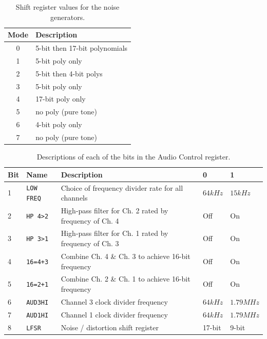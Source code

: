 \documentclass[12pt,a4paper]{article}
\begin{document}
\begin{table}[!htp]
\centering
\caption{Shift register values for the noise generators.}
\label{tab:shift-register}
\small
\begin{tabular}{|c||l|}
\hline
Mode & Description                   \\
\hline\hline
 0    & 5-bit then 17-bit polynomials \\
 1    & 5-bit poly only               \\
 2    & 5-bit then 4-bit polys        \\
 3    & 5-bit poly only               \\
 4    & 17-bit poly only              \\
 5    & no poly (pure tone)           \\
 6    & 4-bit poly only               \\
 7    & no poly (pure tone)           \\
\hline
\end{tabular}
\end{table}

\begin{table}[!htp]
\centering
\caption{Descriptions of each of the bits in the Audio Control register.}
\label{tab:audio-control}
\small
\begin{tabular}{|l|l||l|l|l|}
\hline
 Bit & Name              & Description                                            & 0       & 1         \\
\hline\hline
 1   & \texttt{LOW FREQ} & Choice of frequency divider rate for all channels      & $64kHz$ & $15kHz$   \\
 2   & \texttt{HP 4>2}   & High-pass filter for Ch. 2 rated by frequency of Ch. 4 & Off     & On        \\
 3   & \texttt{HP 3>1}   & High-pass filter for Ch. 1 rated by frequency of Ch. 3 & Off     & On        \\
 4   & \texttt{16=4+3}   & Combine Ch. 4 \& Ch. 3 to achieve 16-bit frequency     & Off     & On        \\
 5   & \texttt{16=2+1}   & Combine Ch. 2 \& Ch. 1 to achieve 16-bit frequency     & Off     & On        \\
 6   & \texttt{AUD3HI}   & Channel 3 clock divider frequency                      & $64kHz$ & $1.79MHz$ \\
 7   & \texttt{AUD1HI}   & Channel 1 clock divider frequency                      & $64kHz$ & $1.79MHz$ \\
 8   & \texttt{LFSR}     & Noise / distortion shift register                      & 17-bit  & 9-bit     \\
\hline
\end{tabular}
\end{table}


\clearpage
\renewcommand\refname{References \& Acknowledgments}
\nocite{*}


\end{document}
